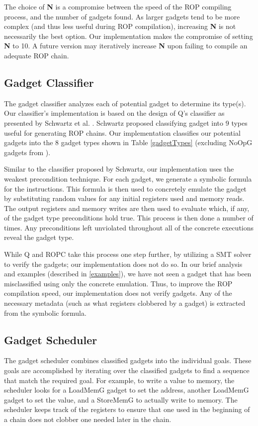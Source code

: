 \documentclass[journal]{IEEEtran}
\begin{document}
The choice of \textbf{N} is a compromise between the speed of the ROP compiling process, and the number of gadgets found.
As larger gadgets tend to be more complex (and thus less useful during ROP compilation), increasing \textbf{N} is not necessarily the best option.
Our implementation makes the compromise of setting \textbf{N} to 10.
A future version may iteratively increase \textbf{N} upon failing to compile an adequate ROP chain.

\subsection{Gadget Classifier}
The gadget classifier analyzes each of potential gadget to determine its type(s).
Our classifier's implementation is based on the design of Q's classifier as presented by Schwartz et al. \cite{schwartz2011q}.
Schwartz proposed classifying gadget into 9 types useful for generating ROP chains.
Our implementation classifies our potential gadgets into the 8 gadget types shown in Table \ref{gadgetTypes} (excluding NoOpG gadgets from \cite{schwartz2011q}).

Similar to the classifier proposed by Schwartz, our implementation uses the weakest precondition technique.
For each gadget, we generate a symbolic formula for the instructions.
This formula is then used to concretely emulate the gadget by substituting random values for any initial registers used and memory reads.
The output registers and memory writes are then used to evaluate which, if any, of the gadget type preconditions hold true.
This process is then done a number of times.
Any preconditions left unviolated throughout all of the concrete executions reveal the gadget type.

While Q \cite{schwartz2011q} and ROPC \cite{ropc} take this process one step further, by utilizing a SMT solver to verify the gadgets; our implementation does not do so.
In our brief analysis and examples (described in \ref{examples}), we have not seen a gadget that has been misclassified using only the concrete emulation.
Thus, to improve the ROP compilation speed, our implementation does not verify gadgets.
Any of the necessary metadata (such as what registers clobbered by a gadget) is extracted from the symbolic formula.

\subsection{Gadget Scheduler}\label{scheduler}
The gadget scheduler combines classified gadgets into the individual goals.
These goals are accomplished by iterating over the classified gadgets to find a sequence that match the required goal. 
For example, to write a value to memory, the scheduler looks for a LoadMemG gadget to set the address, another LoadMemG gadget to set the value, and a StoreMemG to actually write to memory.
The scheduler keeps track of the registers to ensure that one used in the beginning of a chain does not clobber one needed later in the chain.
\end{document}
